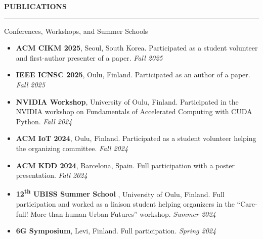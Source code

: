 \documentclass{resume}
\newenvironment{rSectionPlain}[1]{
  \sectionskip
  \MakeUppercase{\bf #1}
  \sectionlineskip
  \hrule
  \vspace{0.3em}
}{
  \par
}
\begin{document}

\begin{rSectionPlain}{Publications}

\nocite{*}
\printbibliography[heading=none]

\end{rSectionPlain}

\begin{rSection}{Conferences, Workshops, and Summer Schools}
\vspace{+.1cm}

\begin{itemize}

    \item {\bf ACM CIKM 2025}, Seoul, South Korea. Participated as a student volunteer and first-author presenter of a paper. {\em Fall 2025}

    \item {\bf IEEE ICNSC 2025}, Oulu, Finland. Participated as an author of a paper. {\em Fall 2025}

    \item {\bf NVIDIA Workshop}, University of Oulu, Finland. Participated in the NVIDIA workshop on Fundamentals of Accelerated Computing with CUDA Python. {\em Fall 2024}

    \item {\bf ACM IoT 2024}, Oulu, Finland. Participated as a student volunteer helping the organizing committee. {\em Fall 2024}

    \item {\bf ACM KDD 2024}, Barcelona, Spain. Full participation with a poster presentation. {\em Fall 2024}

    \item {\bf 12\textsuperscript{th} UBISS Summer School }, University of Oulu, Finland. Full participation and worked as a liaison student helping organizers in the ``Care-full! More-than-human Urban Futures'' workshop. {\em Summer 2024}

    \item {\bf 6G Symposium}, Levi, Finland. Full participation. {\em Spring 2024}


\end{itemize}
\end{rSection}
\end{document}
